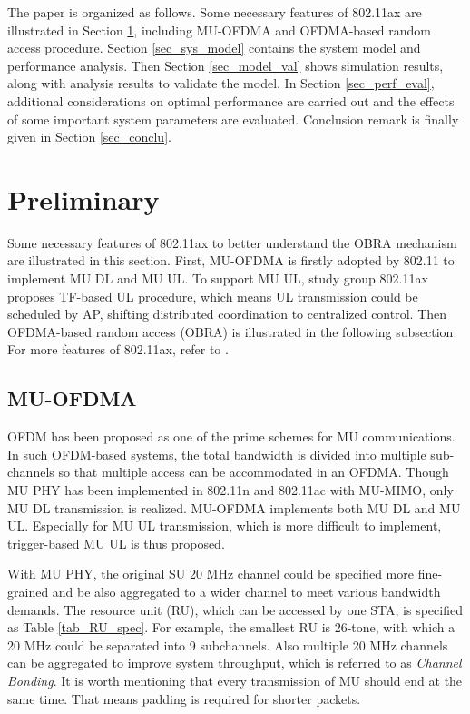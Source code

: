 \documentclass[journal]{IEEEtran}
\begin{document}
The paper is organized as follows.
Some necessary features of 802.11ax are illustrated in Section \ref{sec_ax_feature}, including MU-OFDMA and OFDMA-based random access procedure.
Section \ref{sec_sys_model} contains the system model and performance analysis. 
Then Section \ref{sec_model_val} shows simulation results, along with analysis results to validate the model.
In Section \ref{sec_perf_eval}, additional considerations on optimal performance are carried out and the effects of some important system parameters are evaluated. 
Conclusion remark is finally given in Section \ref{sec_conclu}.


\section{Preliminary}			\label{sec_ax_feature}
Some necessary features of 802.11ax to better understand the OBRA mechanism are illustrated in this section.
First, MU-OFDMA is firstly adopted by 802.11 to implement MU DL and MU UL. 
To support MU UL, study group 802.11ax proposes TF-based UL procedure, which means UL transmission could be scheduled by AP, shifting distributed coordination to centralized control.
Then OFDMA-based random access (OBRA) is illustrated in the following subsection.
For more features of 802.11ax, refer to \cite{draft_ax}\cite{dengquality}.

\subsection{MU-OFDMA}
OFDM has been proposed as one of the prime schemes for MU communications.
In such OFDM-based systems, the total bandwidth is divided into multiple sub-channels so that multiple access can be accommodated in an OFDMA.
Though MU PHY has been implemented in 802.11n and 802.11ac with MU-MIMO, only MU DL transmission is realized. 
MU-OFDMA implements both MU DL and MU UL.
Especially for MU UL transmission, which is more difficult to implement, trigger-based MU UL is thus proposed. 

With MU PHY, the original SU 20 MHz channel could be specified more fine-grained and be also aggregated to a wider channel to meet various bandwidth demands.
The resource unit (RU), which can be accessed by one STA, is specified as Table \ref{tab_RU_spec}. For example, the smallest RU is 26-tone, with which a 20 MHz could be separated into 9 subchannels.
Also multiple 20 MHz channels can be aggregated to improve system throughput, which is referred to as \textit{Channel Bonding}. 
It is worth mentioning that every transmission of MU should end at the same time. That means padding is required for shorter packets.
\end{document}
